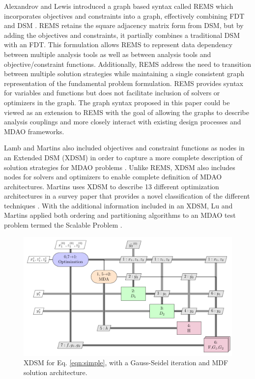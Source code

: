     Alexandrov and Lewis introduced a graph based syntax called REMS which 
    incorporates objectives and constraints into a graph, effectively combining 
    FDT and DSM \cite{alexandrov2004}. REMS retains the square adjacency 
    matrix form from DSM, but by adding the objectives and constraints, it partially 
    combines a traditional DSM with an FDT. This formulation allows REMS to represent data 
    dependency between multiple analysis tools as well as between analysis tools and
    objective/constraint functions. Additionally, REMS address the need to
    transition between multiple solution strategies while maintaining a single consistent  
    graph representation of the fundamental problem formulation. REMS provides
    syntax for variables and functions but does not facilitate inclusion 
    of solvers or optimizers in the graph.  The graph syntax proposed in this paper could  
    be viewed as an extension to REMS with the goal of allowing the graphs to  describe analysis couplings and more 
    closely interact with existing design processes and MDAO frameworks. 

    Lamb and Martins also included objectives and constraint functions as nodes 
    in an Extended DSM (XDSM) in order to capture a more complete description 
    of solution strategies for MDAO problems \cite{Lambe2012}. Unlike REMS, 
    XDSM also includes nodes for solvers and optimizers to enable complete 
    definition of MDAO architectures. Martins uses XDSM to describe 13 different 
    optimization architectures in a survey paper that provides a novel 
    classification of the different techniques \cite{Lambe2011}. With the 
    additional information included in an XDSM, Lu and Martins applied both 
    ordering and partitioning algorithms to an MDAO test problem termed the 
    Scalable Problem \cite{Lu2012}. 

    \begin{figure}
        \begin{center}
        \includegraphics[height=.25\textheight]{XDSM/simple}
        \caption{XDSM for Eq. \ref{eqn:simple}, with a Gauss-Seidel iteration 
          and MDF solution architecture. \label{fig:XDSM_simple}}
        \end{center}
    \end{figure}

